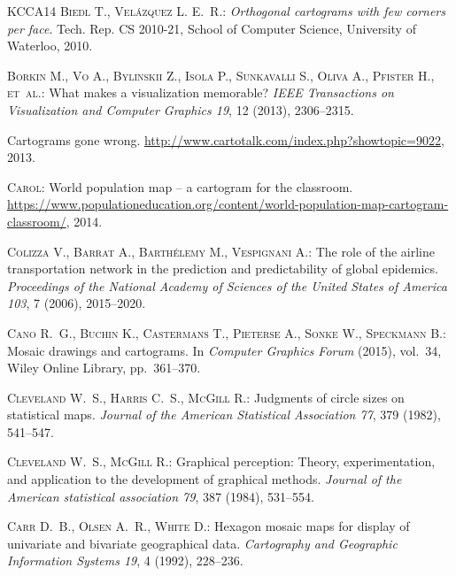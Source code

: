\documentclass{egpubl}
\begin{document}
\begin{thebibliography}{\uppercase{KCCA{\etalchar{*}}14}}
\textsc{Biedl T., Vel\'{a}zquez L. E.~R.}:
\newblock \emph{Orthogonal cartograms with few corners per face}.
\newblock Tech. Rep. CS 2010-21, School of Computer Science, University of
  Waterloo, 2010.

\textsc{Borkin M., Vo A., Bylinskii Z., Isola P., Sunkavalli S., Oliva A.,
  Pfister H., et~al.}:
\newblock What makes a visualization memorable?
\newblock \emph{IEEE Transactions on Visualization and Computer Graphics 19},
  12 (2013), 2306--2315.

Cartograms gone wrong.
\newblock \url{http://www.cartotalk.com/index.php?showtopic=9022}, 2013.

\textsc{Carol}:
\newblock World population map -- a cartogram for the classroom.
\newblock
  \url{https://www.populationeducation.org/content/world-population-map-cartogram-classroom/},
  2014.

\textsc{Colizza V., Barrat A., Barth{\'e}lemy M., Vespignani A.}:
\newblock The role of the airline transportation network in the prediction and
  predictability of global epidemics.
\newblock \emph{Proceedings of the National Academy of Sciences of the United
  States of America 103}, 7 (2006), 2015--2020.

\textsc{Cano R.~G., Buchin K., Castermans T., Pieterse A., Sonke W., Speckmann
  B.}:
\newblock Mosaic drawings and cartograms.
\newblock In \emph{Computer Graphics Forum} (2015), vol.~34, Wiley Online
  Library, pp.~361--370.

\textsc{Cleveland W.~S., Harris C.~S., McGill R.}:
\newblock Judgments of circle sizes on statistical maps.
\newblock \emph{Journal of the American Statistical Association 77}, 379
  (1982), 541--547.

\textsc{Cleveland W.~S., McGill R.}:
\newblock Graphical perception: Theory, experimentation, and application to the
  development of graphical methods.
\newblock \emph{Journal of the American statistical association 79}, 387
  (1984), 531--554.

\textsc{Carr D.~B., Olsen A.~R., White D.}:
\newblock Hexagon mosaic maps for display of univariate and bivariate
  geographical data.
\newblock \emph{Cartography and Geographic Information Systems 19}, 4 (1992),
  228--236.


\end{thebibliography}
\end{document}
